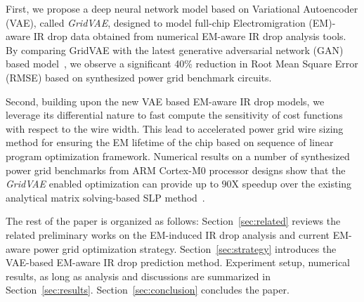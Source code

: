 \begin{itemlist}

\item  First, we propose a deep neural network model based on Variational Autoencoder (VAE), called {\it GridVAE}, designed to model full-chip Electromigration (EM)-aware IR drop data obtained from numerical EM-aware IR drop analysis tools. By comparing GridVAE with the latest generative adversarial network (GAN) based model~\~\cite{ZhouJin:ICCAD'20}, we observe a significant 40\% reduction in Root Mean Square Error (RMSE) based on synthesized power grid benchmark circuits.

\item Second, building upon the new VAE based EM-aware IR drop models, we leverage its differential nature to fast compute the sensitivity of cost functions with respect to the wire width. This lead to accelerated power grid wire sizing method for ensuring the EM lifetime of the chip based on sequence of linear program optimization framework. Numerical results on a number of synthesized power grid benchmarks from ARM Cortex-M0 processor designs show that the {\it GridVAE} enabled optimization can provide up to $90$X speedup over the existing analytical matrix solving-based SLP method~\cite{Sukharev:2019pg}.
 
\end{itemlist}

The rest of the paper is organized as follows: Section~\ref{sec:related} reviews the related preliminary works on the EM-induced IR drop analysis and current EM-aware power grid optimization strategy. Section~\ref{sec:strategy} introduces the VAE-based EM-aware IR drop prediction method. Experiment setup, numerical results, as long as analysis and discussions are summarized in Section~\ref{sec:results}.  Section~\ref{sec:conclusion} concludes the paper.